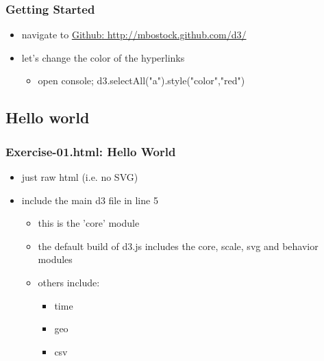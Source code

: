 \documentclass{beamer}
\begin{document}
\begin{frame}
    \frametitle{Getting Started}
    \begin{itemize}
    \item navigate to \href{http://mbostock.github.com/d3/}{\underline{Github}: http://mbostock.github.com/d3/}
    \item let's change the color of the hyperlinks
        \begin{itemize}
        \item open console; d3.selectAll("a").style("color","red")
        \end{itemize}
    \end{itemize}


\subsection{Hello world}

\begin{frame}
    \frametitle{Exercise-01.html: Hello World}
    \begin{itemize}
    \item just raw html (i.e. no SVG)
    \item include the main d3 file in line 5
        \begin{itemize}
        \item this is the 'core' module
        \item the default build of d3.js includes the core, scale, svg and behavior modules
        \item others include:
            \begin{itemize}
            \item time
            \item geo
            \item csv
            \end{itemize}
        \end{itemize}
    \end{itemize}
\end{frame}



\end{frame}
\end{document}
